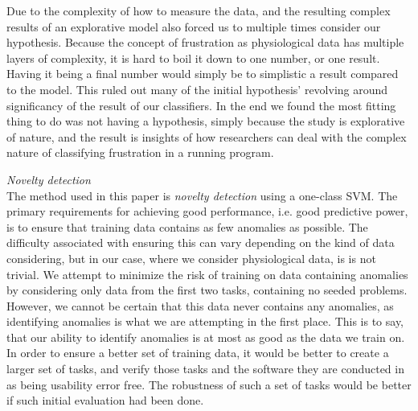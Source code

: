 Due to the complexity of how to measure the data, and the resulting complex results of an explorative model also forced us to multiple times consider our hypothesis. Because the concept of frustration as physiological data has multiple layers of complexity, it is hard to boil it down to one number, or one result. Having it being a final number would simply be to simplistic a result compared to the model. This ruled out many of the initial hypothesis' revolving around significancy of the result of our classifiers. In the end we found the most fitting thing to do was not having a hypothesis, simply because the study is explorative of nature, and the result is insights of how researchers can deal with the complex nature of classifying frustration in a running program.

\textit{Novelty detection}\\
The method used in this paper is \textit{novelty detection} using a one-class SVM. The primary requirements for
achieving good performance, i.e. good predictive power, is to ensure that training data contains as few anomalies as
possible. The difficulty associated with ensuring this can vary depending on the kind of data considering, but in our
case, where we consider physiological data, is is not trivial. We attempt to minimize the risk of
training on data containing anomalies by considering only data from the first two tasks, containing no seeded
problems. However, we cannot be certain that this data never contains any anomalies, as identifying anomalies is what we
are attempting in the first place. This is to say, that our ability to identify anomalies is at most as good as the data
we train on. In order to ensure a better set of training data, it would be better to create a larger set of tasks, and verify those tasks and the software they are conducted in as being usability error free. 
The robustness of such a set of tasks would be better if such initial evaluation had been done.

